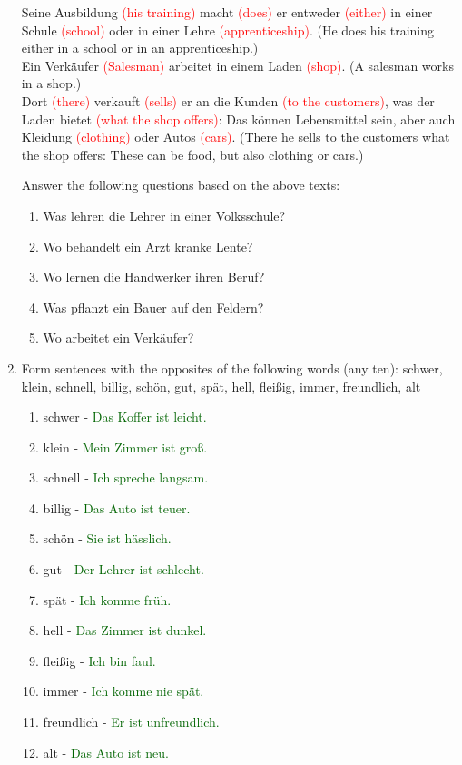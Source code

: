 \documentclass{article}
\begin{document}
\begin{enumerate}
    Seine Ausbildung \textcolor{red}{(his training)} macht \textcolor{red}{(does)} er entweder \textcolor{red}{(either)} in einer Schule \textcolor{red}{(school)} oder in einer Lehre \textcolor{red}{(apprenticeship)}. (He does his training either in a school or in an apprenticeship.) \\
    Ein Verkäufer \textcolor{red}{(Salesman)} arbeitet in einem Laden \textcolor{red}{(shop)}. (A salesman works in a shop.) \\
    Dort \textcolor{red}{(there)} verkauft \textcolor{red}{(sells)} er an die Kunden \textcolor{red}{(to the customers)}, was der Laden bietet \textcolor{red}{(what the shop offers)}: Das können Lebensmittel sein, aber auch Kleidung \textcolor{red}{(clothing)} oder Autos \textcolor{red}{(cars)}. (There he sells to the customers what the shop offers: These can be food, but also clothing or cars.)

    Answer the following questions based on the above texts:
    \begin{enumerate}
        \item Was lehren die Lehrer in einer Volksschule?
        \item Wo behandelt ein Arzt kranke Lente?
        \item Wo lernen die Handwerker ihren Beruf?
        \item Was pflanzt ein Bauer auf den Feldern?
        \item Wo arbeitet ein Verkäufer?
    \end{enumerate}

    \item Form sentences with the opposites of the following words (any ten):
    schwer, klein, schnell, billig, schön, gut, spät, hell, fleißig, immer, freundlich, alt
    \begin{enumerate}
        \item schwer - \textcolor{darkgreen}{Das Koffer ist leicht.}
        \item klein - \textcolor{darkgreen}{Mein Zimmer ist groß.}
        \item schnell - \textcolor{darkgreen}{Ich spreche langsam.}
        \item billig - \textcolor{darkgreen}{Das Auto ist teuer.}
        \item schön - \textcolor{darkgreen}{Sie ist hässlich.}
        \item gut - \textcolor{darkgreen}{Der Lehrer ist schlecht.}
        \item spät - \textcolor{darkgreen}{Ich komme früh.}
        \item hell - \textcolor{darkgreen}{Das Zimmer ist dunkel.}
        \item fleißig - \textcolor{darkgreen}{Ich bin faul.}
        \item immer - \textcolor{darkgreen}{Ich komme nie spät.}
        \item freundlich - \textcolor{darkgreen}{Er ist unfreundlich.}
        \item alt - \textcolor{darkgreen}{Das Auto ist neu.}
    \end{enumerate}



\end{enumerate}
\end{document}
